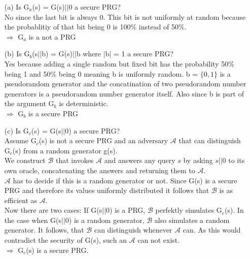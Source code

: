 
\begin{itemize}
\item[(a)]
	Is G\(_{a}\)(s) = G(s)\(\vert \vert\)0 a secure PRG? \\
	No since the last bit is always 0. This bit is not uniformly at random because the probablitiy of that bit being 0 is 100\(\%\) instead of 50\(\%\). \\
	\(\Rightarrow\)  G\(_{a}\) is a not a PRG
\item[(b)]
	Is G\(_{b}\)(s\(\vert \vert\)b) = G(s)\(\vert \vert\)b where \(\vert\)b\(\vert\) = 1 a secure PRG? \\
	Yes because adding a single random but fixed bit has the probability 50\(\%\) being 1 and  50\(\%\) being 0 meaning b is uniformly random.
	b = \(\{0,1\}\) is a pseudorandom generator and the concatination of two pseudorandom number generators is a pseudorandom number generator itself.
	Also since b is part of the argument G\(_{b}\) is deterministic. \\
	\(\Rightarrow\)  G\(_{b}\) is a secure PRG\\
\item[(c)]
	Is G\(_{c}\)(s) = G(s\(\vert \vert\)0) a secure PRG? \\
	Assume  G\(_{c}\)(s)  is not a secure PRG and an adversary \(\mathcal{A}\) that can distinguish G\(_{c}\)(s) from a random generator g(s).\\
	We construct \(\mathcal{B}\) that invokes \(\mathcal{A}\)  and answers any query \(s\) by asking \(s\vert \vert 0\) to its own oracle, concatenating the answers and returning them to \(\mathcal{A}\).\\
	\(\mathcal{A}\) has to decide if this is a random generator or not. 
	Since G(s) is a secure PRG and therefore its values uniformly distributed it follows that \(\mathcal{B}\) is as efficient as \(\mathcal{A}\).\\
	Now there are two cases: If G(s\(\vert \vert\)0) is a PRG, \(\mathcal{B}\) perfektly simulates G\(_{c}\)(s). In the case when G(s\(\vert \vert\)0) is a random generator, \(\mathcal{B}\) also simulates a random generator. 
	It follows, that \(\mathcal{B}\) can distinguish
	whenever \(\mathcal{A}\) can. As this would contradict the security of G(s), such an \(\mathcal{A}\) can not exist.\\
	\(\Rightarrow\) G\(_{c}\)(s) is a secure PRG.

\end{itemize}
